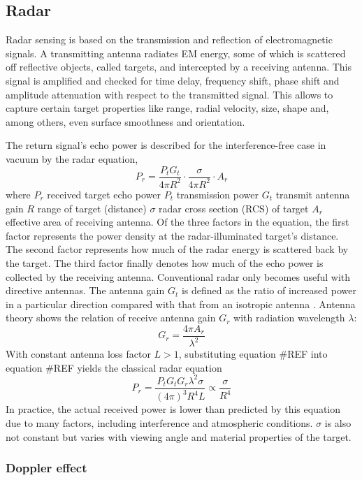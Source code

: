 \subsection{Radar}\label{radar}

Radar sensing is based on the transmission and reflection of
electromagnetic signals. A transmitting antenna radiates EM energy, some
of which is scattered off reflective objects, called targets, and
intercepted by a receiving antenna. This signal is amplified and checked
for time delay, frequency shift, phase shift and amplitude attenuation
with respect to the transmitted signal. This allows to capture certain
target properties like range, radial velocity, size, shape and, among
others, even surface smoothness and orientation. \cite{Skolnik2008}

The return signal's echo power is described for the interference-free
case in vacuum by the radar equation, \[
P_r = 
\frac{P_t G_t}{4\pi R^2}
\cdot
\frac{\sigma}{4\pi R^2}
\cdot
A_r
\] where \(P_r\) received target echo power \(P_t\) transmission power
\(G_t\) transmit antenna gain \(R\) range of target (distance)
\(\sigma\) radar cross section (RCS) of target \(A_r\) effective area of
receiving antenna. Of the three factors in the equation, the first
factor represents the power density at the radar-illuminated target's
distance. The second factor represents how much of the radar energy is
scattered back by the target. The third factor finally denotes how much
of the echo power is collected by the receiving antenna.
\cite{Skolnik2008} Conventional radar only becomes useful with directive
antennas. The antenna gain \(G_t\) is defined as the ratio of increased
power in a particular direction compared with that from an isotropic
antenna \cite{Adams2012}. Antenna theory shows \cite{Balanis2015} the
relation of receive antenna gain \(G_r\) with radiation wavelength
\(\lambda\): \[G_r = \frac{4\pi A_r}{\lambda^2}\] With constant antenna
loss factor \(L>1\), substituting equation \#REF into equation \#REF
yields the classical radar equation \[
P_r =
\frac{P_t G_t G_r \lambda^2 \sigma}{(4\pi)^3R^4L}
\propto \frac{\sigma}{R^4}
\] In practice, the actual received power is lower than predicted by
this equation due to many factors, including interference and
atmospheric conditions. \(\sigma\) is also not constant but varies with
viewing angle and material properties of the target. \cite{Adams2012}

\subsubsection{Doppler effect}\label{doppler-effect}

